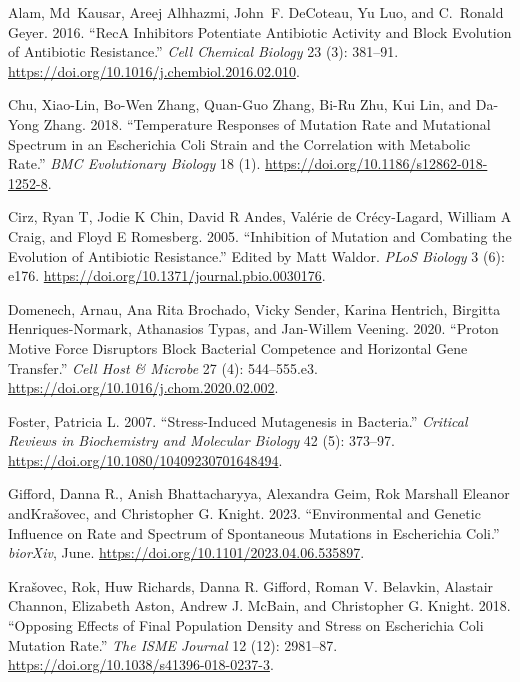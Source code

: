 \documentclass[
  12pt,
  letterpaper,
  DIV=11,
  numbers=noendperiod]{scrreprt}
\newlength{\cslhangindent}
\newlength{\cslentryspacingunit} %
\newenvironment{CSLReferences}[2] %
 {%
  \setlength{\parindent}{0pt}
  \ifodd #1
  \let\oldpar\par
  \def\par{\hangindent=\cslhangindent\oldpar}
  \fi
  \setlength{\parskip}{#2\cslentryspacingunit}
 }%
 {}
\begin{document}
\hypertarget{refs}{}
\begin{CSLReferences}{1}{0}
\leavevmode{}%
Alam, Md~Kausar, Areej Alhhazmi, John~F. DeCoteau, Yu Luo, and C.~Ronald
Geyer. 2016. {``RecA Inhibitors Potentiate Antibiotic Activity and Block
Evolution of Antibiotic Resistance.''} \emph{Cell Chemical Biology} 23
(3): 381--91. \url{https://doi.org/10.1016/j.chembiol.2016.02.010}.

\leavevmode{}%
Chu, Xiao-Lin, Bo-Wen Zhang, Quan-Guo Zhang, Bi-Ru Zhu, Kui Lin, and
Da-Yong Zhang. 2018. {``Temperature Responses of Mutation Rate and
Mutational Spectrum in an Escherichia Coli Strain and the Correlation
with Metabolic Rate.''} \emph{BMC Evolutionary Biology} 18 (1).
\url{https://doi.org/10.1186/s12862-018-1252-8}.

\leavevmode{}%
Cirz, Ryan T, Jodie K Chin, David R Andes, Valérie de Crécy-Lagard,
William A Craig, and Floyd E Romesberg. 2005. {``Inhibition of Mutation
and Combating the Evolution of Antibiotic Resistance.''} Edited by Matt
Waldor. \emph{PLoS Biology} 3 (6): e176.
\url{https://doi.org/10.1371/journal.pbio.0030176}.

\leavevmode{}%
Domenech, Arnau, Ana Rita Brochado, Vicky Sender, Karina Hentrich,
Birgitta Henriques-Normark, Athanasios Typas, and Jan-Willem Veening.
2020. {``Proton Motive Force Disruptors Block Bacterial Competence and
Horizontal Gene Transfer.''} \emph{Cell Host \& Microbe} 27 (4):
544--555.e3. \url{https://doi.org/10.1016/j.chom.2020.02.002}.

\leavevmode{}%
Foster, Patricia L. 2007. {``Stress-Induced Mutagenesis in Bacteria.''}
\emph{Critical Reviews in Biochemistry and Molecular Biology} 42 (5):
373--97. \url{https://doi.org/10.1080/10409230701648494}.

\leavevmode{}%
Gifford, Danna R., Anish Bhattacharyya, Alexandra Geim, Rok Marshall
Eleanor andKrašovec, and Christopher G. Knight. 2023. {``Environmental
and Genetic Influence on Rate and Spectrum of Spontaneous Mutations in
Escherichia Coli.''} \emph{biorXiv}, June.
\url{https://doi.org/10.1101/2023.04.06.535897}.

\leavevmode{}%
Krašovec, Rok, Huw Richards, Danna R. Gifford, Roman V. Belavkin,
Alastair Channon, Elizabeth Aston, Andrew J. McBain, and Christopher G.
Knight. 2018. {``Opposing Effects of Final Population Density and Stress
on Escherichia Coli Mutation Rate.''} \emph{The ISME Journal} 12 (12):
2981--87. \url{https://doi.org/10.1038/s41396-018-0237-3}.


\end{CSLReferences}
\end{document}
